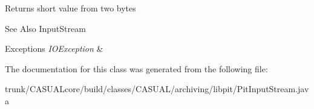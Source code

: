 \begin{DoxyReturn}{Returns}
short value from two bytes 
\end{DoxyReturn}
\begin{DoxySeeAlso}{See Also}
Input\-Stream 
\end{DoxySeeAlso}

\begin{DoxyExceptions}{Exceptions}
{\em I\-O\-Exception} & \\
\hline
\end{DoxyExceptions}


The documentation for this class was generated from the following file\-:\begin{DoxyCompactItemize}
\item 
trunk/\-C\-A\-S\-U\-A\-Lcore/build/classes/\-C\-A\-S\-U\-A\-L/archiving/libpit/Pit\-Input\-Stream.\-java\end{DoxyCompactItemize}
